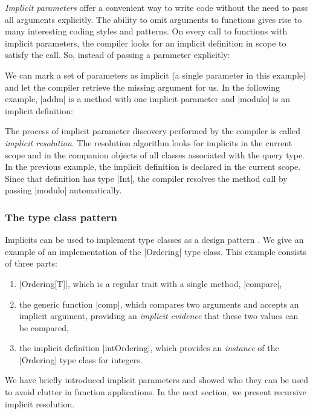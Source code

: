 \emph{Implicit parameters} offer a convenient way to write code without the need to pass all arguments explicitly.
The ability to omit arguments to functions gives rise to many interesting coding styles and patterns.
On every call to functions with implicit parameters, the compiler looks for an implicit definition in scope to satisfy the call.
So, instead of passing a parameter explicitly:

\explicitModulo

\noindent
We can mark a set of parameters as implicit (a single parameter in this example) and let the compiler retrieve the missing argument for us.
In the following example, |addm| is a method with one implicit parameter and |modulo| is an implicit definition:

\implicitModulo

The process of implicit parameter discovery performed by the compiler is called \emph{implicit resolution}.
The resolution algorithm looks for implicits in the current scope and in the companion objects of all classes associated with the query type.
In the previous example, the implicit definition is declared in the current scope.
Since that definition has type |Int|, the compiler resolves the method call by passing |modulo| automatically.

\subsubsection{The type class pattern}

Implicits can be used to implement type classes \citep{wadler1989howto} as a design pattern \citep{oliveira2010type}.
We give an example of an implementation of the |Ordering| type class.
This example consists of three parts:

\begin{enumerate}
  \item |Ordering[T]|, which is a regular trait with a single method, |compare|,
  \item the generic function |comp|, which compares two arguments and accepts an implicit argument, providing an \emph{implicit evidence} that these two values can be compared,
  \item the implicit definition |intOrdering|, which provides an \emph{instance} of the |Ordering| type class for integers.
\end{enumerate}

\ordExample

We have briefly introduced implicit parameters and showed who they can be used to avoid clutter in function applications.
In the next section, we present recursive implicit resolution.

